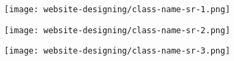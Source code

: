 \begin{figure}[h]
\caption{Adding Class Name to HTML Element}
\label{class-name-sr}
\centering
	\begin{subfigure}{.49\linewidth}
	\centering
	\texttt{[image: website-designing/class-name-sr-1.png]}
	\end{subfigure}
	\begin{subfigure}{0.49\linewidth}
	\centering
	\texttt{[image: website-designing/class-name-sr-2.png]}
	\end{subfigure}
	\begin{subfigure}{0.49\linewidth}
	\centering
	\texttt{[image: website-designing/class-name-sr-3.png]}
	\end{subfigure}
\end{figure}

